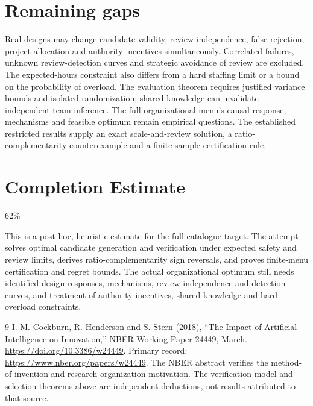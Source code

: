 \documentclass[11pt,a4paper]{article}
\theoremstyle{definition}
\theoremstyle{remark}
\begin{document}
\section{Remaining gaps}
Real designs may change candidate validity, review independence, false rejection, project allocation and authority incentives simultaneously. Correlated failures, unknown review-detection curves and strategic avoidance of review are excluded. The expected-hours constraint also differs from a hard staffing limit or a bound on the probability of overload. The evaluation theorem requires justified variance bounds and isolated randomization; shared knowledge can invalidate independent-team inference. The full organizational menu's causal response, mechanisms and feasible optimum remain empirical questions. The established restricted results supply an exact scale-and-review solution, a ratio-complementarity counterexample and a finite-sample certification rule.

\section{Completion Estimate}
62\%

This is a post hoc, heuristic estimate for the full catalogue target.
The attempt solves optimal candidate generation and verification under expected safety and review limits, derives ratio-complementarity sign reversals, and proves finite-menu certification and regret bounds. The actual organizational optimum still needs identified design responses, mechanisms, review independence and detection curves, and treatment of authority incentives, shared knowledge and hard overload constraints.

\begin{thebibliography}{9}
 I. M. Cockburn, R. Henderson and S. Stern (2018), ``The Impact of Artificial Intelligence on Innovation,'' NBER Working Paper 24449, March. \url{https://doi.org/10.3386/w24449}. Primary record: \url{https://www.nber.org/papers/w24449}. The NBER abstract verifies the method-of-invention and research-organization motivation. The verification model and selection theorems above are independent deductions, not results attributed to that source.
\end{thebibliography}
\end{document}
